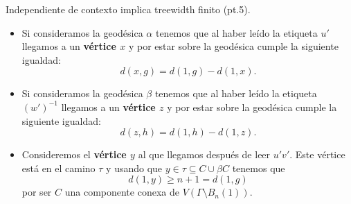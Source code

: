 \documentclass[aspectratio=169, 11pt]{beamer}
\begin{document}
	\begin{frame}[fragile]{Independiente de contexto implica treewidth finito (pt.5).}
		\begin{itemize}
			\item 
				Si consideramos la geodésica $\alpha$ tenemos que al haber leído la etiqueta $u'$ llegamos a un \textbf{vértice $x$} y por estar sobre la geodésica cumple la siguiente igualdad:
				\begin{equation*}
					d(x,g) = d(1,g) - d(1,x).
				\end{equation*}
			
			\item 
				Si consideramos la geodésica $\beta$ tenemos que al haber leído la etiqueta $(w')^{-1}$ llegamos a un \textbf{vértice $z$} y por estar sobre la geodésica cumple la siguiente igualdad:
				\begin{equation*}
					d(z,h)  = d(1,h) - d(1,z).
				\end{equation*}

			\item 
				Consideremos el \textbf{vértice $y$} al que llegamos después de leer $u'v'$.
				Este vértice está en el camino $\tau$ y usando que $y \in \tau \subseteq C \cup \beta C $ tenemos que
					\[
						d(1,y) \ge n+1 = d(1,g)	
					\]
				por ser $C$ una componente conexa de $V(\Gamma \setminus B_{n}(1))$.
			
		\end{itemize}
	\end{frame}
\end{document}

